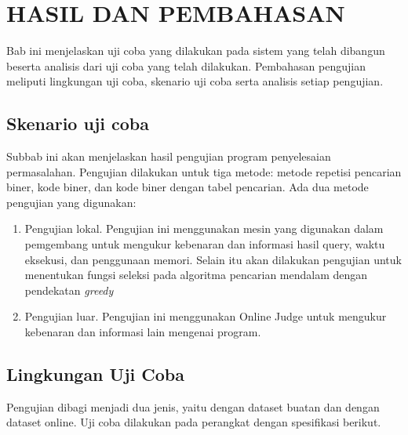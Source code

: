 \chapter{HASIL DAN PEMBAHASAN}

Bab ini menjelaskan uji coba yang dilakukan pada sistem yang telah dibangun beserta analisis dari uji coba yang telah dilakukan. Pembahasan pengujian meliputi lingkungan uji coba, skenario uji coba serta analisis setiap pengujian.

\section{Skenario uji coba}

Subbab ini akan menjelaskan hasil pengujian program penyelesaian permasalahan. Pengujian dilakukan untuk tiga metode: metode repetisi pencarian biner, kode biner, dan kode biner dengan tabel pencarian. Ada dua metode pengujian yang digunakan:

\begin{enumerate}
  \item Pengujian lokal. Pengujian ini menggunakan mesin yang digunakan dalam pemgembang untuk mengukur kebenaran dan informasi hasil query, waktu eksekusi, dan penggunaan memori. Selain itu akan dilakukan pengujian untuk menentukan fungsi seleksi pada algoritma pencarian mendalam dengan pendekatan \textit{greedy}
  \item Pengujian luar. Pengujian ini menggunakan Online Judge untuk mengukur kebenaran dan informasi lain mengenai program.
\end{enumerate}

\section{Lingkungan Uji Coba}

Pengujian dibagi menjadi dua jenis, yaitu dengan dataset buatan dan dengan dataset online. Uji coba dilakukan pada perangkat dengan spesifikasi berikut.

